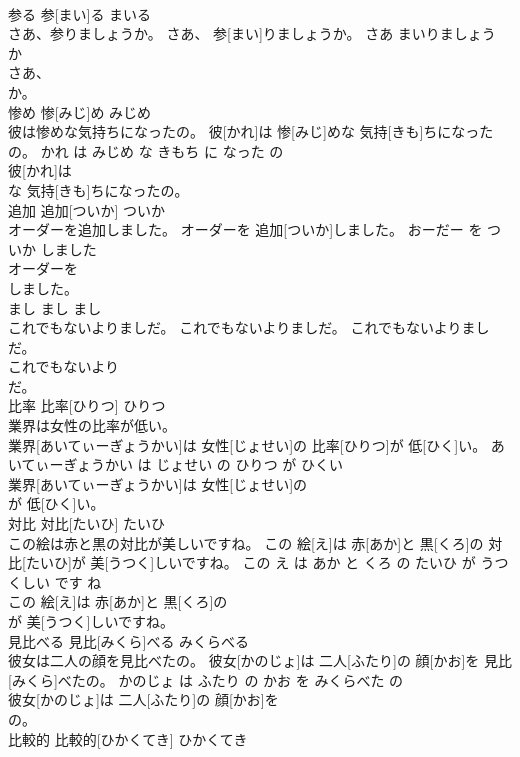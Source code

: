 \documentclass[8pt]{extreport}
\begin{document}
\begin{CJK}{UTF8}{min}
\\	参る	参[まい]る	まいる	
\\	さあ、参りましょうか。	さあ、 参[まい]りましょうか。	さあ まいりましょう か	
\\	さあ、
\\	か。			
\\	惨め	惨[みじ]め	みじめ	
\\	彼は惨めな気持ちになったの。	彼[かれ]は 惨[みじ]めな 気持[きも]ちになったの。	かれ は みじめ な きもち に なった の	
\\	彼[かれ]は
\\	な 気持[きも]ちになったの。			
\\	追加	追加[ついか]	ついか	
\\	オーダーを追加しました。	オーダーを 追加[ついか]しました。	おーだー を ついか しました	
\\	オーダーを
\\	しました。			
\\	まし	まし	まし	
\\	これでもないよりましだ。	これでもないよりましだ。	これでもないよりましだ。	
\\	これでもないより
\\	だ。			
\\	比率	比率[ひりつ]	ひりつ	
\\	業界は女性の比率が低い。	
\\	業界[あいてぃーぎょうかい]は 女性[じょせい]の 比率[ひりつ]が 低[ひく]い。	あいてぃーぎょうかい は じょせい の ひりつ が ひくい	
\\	業界[あいてぃーぎょうかい]は 女性[じょせい]の
\\	が 低[ひく]い。			
\\	対比	対比[たいひ]	たいひ	
\\	この絵は赤と黒の対比が美しいですね。	この 絵[え]は 赤[あか]と 黒[くろ]の 対比[たいひ]が 美[うつく]しいですね。	この え は あか と くろ の たいひ が うつくしい です ね	
\\	この 絵[え]は 赤[あか]と 黒[くろ]の
\\	が 美[うつく]しいですね。			
\\	見比べる	見比[みくら]べる	みくらべる	
\\	彼女は二人の顔を見比べたの。	彼女[かのじょ]は 二人[ふたり]の 顔[かお]を 見比[みくら]べたの。	かのじょ は ふたり の かお を みくらべた の	
\\	彼女[かのじょ]は 二人[ふたり]の 顔[かお]を
\\	の。			
\\	比較的	比較的[ひかくてき]	ひかくてき	

\end{CJK}
\end{document}
